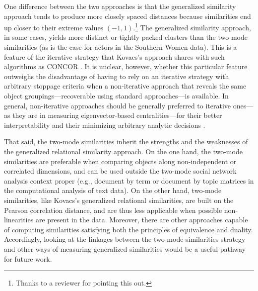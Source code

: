 \documentclass[a4paper,fleqn]{cas-sc}
\begin{document}
One difference between the two approaches is that the generalized similarity approach tends to produce more closely spaced distances because similarities end up closer to their extreme values $(-1, 1)$.\footnote{Thanks to a reviewer for pointing this out.} The generalized similarity approach, in some cases, yields more distinct or tightly packed clusters than the two mode similarities (as is the case for actors in the Southern Women data). This is a feature of the iterative strategy that Kovacs's approach shares with such algorithms as CONCOR \citep{chen2002generalized}. It is unclear, however, whether this particular feature outweighs the disadvantage of having to rely on an iterative strategy with arbitrary stoppage criteria when a non-iterative approach that reveals the same object groupings---recoverable using standard approaches---is available. In general, non-iterative approaches should be generally preferred to iterative ones---as they are in measuring eigenvector-based centralities---for their better interpretability and their minimizing arbitrary analytic decisions \citep{mealy2019interpreting}.

That said, the two-mode similarities inherit the strengths and the weaknesses of the generalized relational similarity approach. On the one hand, the two-mode similarities are preferable when comparing objects along non-independent or correlated dimensions, and can be used outside the two-mode social network analysis context proper (e.g., document by term or document by topic matrices in the computational analysis of text data). On the other hand, two-mode similarities, like Kovacs's generalized relational similarities, are built on the Pearson correlation distance, and are thus less applicable when possible non-linearities are present in the data. Moreover, there are other approaches capable of computing similarities satisfying both the principles of equivalence and duality. Accordingly, looking at the linkages between the two-mode similarities strategy and other ways of measuring generalized similarities would be a useful pathway for future work. 

%


\end{document}

